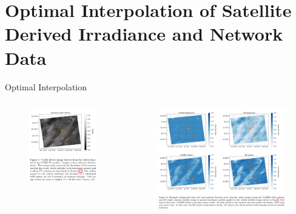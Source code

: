 \documentclass[aspectratio=169]{beamer}
\begin{document}
\section[Optimal Interpolation]{Optimal Interpolation of Satellite
  Derived Irradiance and Network Data}
\begin{frame}{Optimal Interpolation}
\begin{columns}
\begin{column}{0.4\textwidth}
\begin{figure}[h]
  \includegraphics[height=.7\textheight]{figs/satimg.png}
\end{figure}
\end{column}
\begin{column}{0.6\textwidth}
\begin{figure}[h]
  \includegraphics[height=.7\textheight]{figs/satoi_improv.png}
\end{figure}
\end{column}
\end{columns}
\end{frame}
\end{document}
